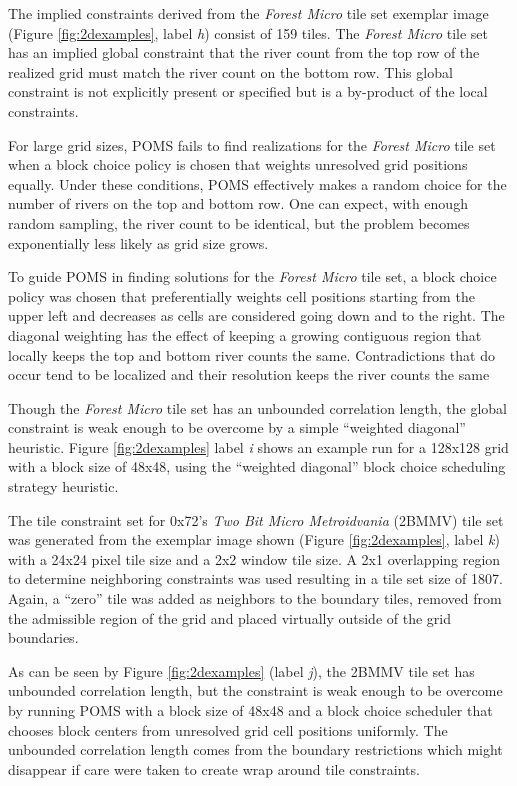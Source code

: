 The implied constraints derived from the \textit{Forest Micro} tile set exemplar image (Figure \ref{fig:2dexamples}, label \textit{h}) consist of 159 tiles.
The \textit{Forest Micro} tile set has an implied global constraint that the river count from the top row of the realized
grid must match the river count on the bottom row.
This global constraint is not explicitly present or specified but is a by-product of the local constraints.

For large grid sizes, POMS fails to find realizations for the \textit{Forest Micro} tile set when a block
choice policy is chosen that weights unresolved grid positions equally.
Under these conditions, POMS effectively makes a random choice for the number of rivers on the top and bottom row.
One can expect, with enough random sampling, the river count to be identical, but the problem
becomes exponentially less likely as grid size grows.

To guide POMS in finding solutions for the \textit{Forest Micro} tile set, a
block choice policy was chosen that preferentially weights cell positions starting from the upper left and decreases as
cells are considered going down and to the right.
The diagonal weighting has the effect of keeping a growing contiguous region that locally keeps the top and bottom
river counts the same.
Contradictions that do occur tend to be localized and their resolution keeps the river counts the same

Though the \textit{Forest Micro} tile set has an unbounded correlation length, the global constraint is weak enough
to be overcome by a simple ``weighted diagonal'' heuristic.
Figure \ref{fig:2dexamples} label \textit{i} shows an example run for a 128x128 grid with a block size of 48x48, using
the ``weighted diagonal'' block choice scheduling strategy heuristic.

The tile constraint set for 0x72's \textit{Two Bit Micro Metroidvania} (2BMMV) tile set was
generated from the exemplar image shown (Figure \ref{fig:2dexamples}, label \textit{k}) with a 24x24 pixel tile size and a 2x2 window tile size.
A 2x1 overlapping region to determine neighboring constraints was used resulting in a tile set size of 1807.
Again, a ``zero'' tile was added as neighbors to the boundary tiles, removed from
the admissible region of the grid and placed virtually outside of the grid boundaries.

As can be seen by Figure \ref{fig:2dexamples} (label \textit{j}), the 2BMMV tile set has unbounded correlation length, but the constraint is weak
enough to be overcome by running POMS with a block size of 48x48 and a block choice scheduler that chooses block centers from
unresolved grid cell positions uniformly.
The unbounded correlation length comes from the boundary restrictions which might disappear if care were taken
to create wrap around tile constraints.

